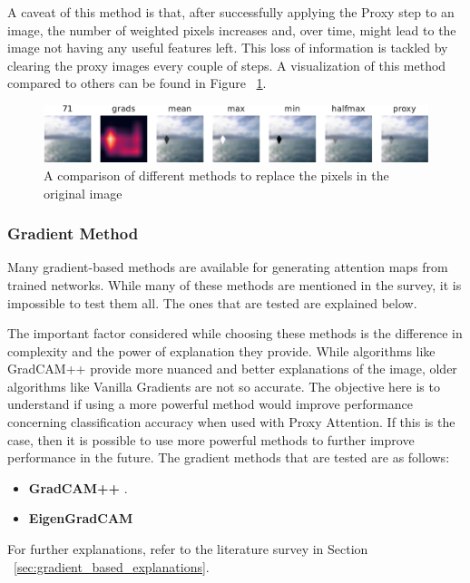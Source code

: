 \documentclass[a4paper,11pt,openright]{book}
\begin{document}
A caveat of this method is that, after successfully applying the Proxy step to an image, the number of weighted pixels increases and, over time, might lead to the image not having any useful features left. This loss of information is tackled by clearing the proxy images every couple of steps.
A visualization of this method compared to others can be found in Figure ~\ref{fig:methods}.

\begin{figure}[h]
    \centering
    \includegraphics[width=1\textwidth]{images/methods-crop.pdf}
    \caption{A comparison of different methods to replace the pixels in the original image}
    \label{fig:methods}
\end{figure}

\subsubsection{Gradient Method} \label{sec:grad_method}
Many gradient-based methods are available for generating attention maps from trained networks. While many of these methods are mentioned in the survey, it is impossible to test them all. The ones that are tested are explained below.

The important factor considered while choosing these methods is the difference in complexity and the power of explanation they provide. While algorithms like GradCAM++ \cite{chattopadhayGradCAMGeneralizedGradientBased2018} provide more nuanced and better explanations of the image, older algorithms like Vanilla Gradients \cite{zeilerVisualizingUnderstandingConvolutional2013} are not so accurate. The objective here is to understand if using a more powerful method would improve performance concerning classification accuracy when used with Proxy Attention. If this is the case, then it is possible to use more powerful methods to further improve performance in the future.
The gradient methods that are tested are as follows:
\begin{itemize}
    \item \textbf{GradCAM++} \cite{chattopadhayGradCAMGeneralizedGradientBased2018}.
    \item \textbf{EigenGradCAM} \cite{banymuhammadEigenCAMVisualExplanations2021}
\end{itemize}
For further explanations, refer to the literature survey in Section ~\ref{sec:gradient_based_explanations}.
\end{document}
